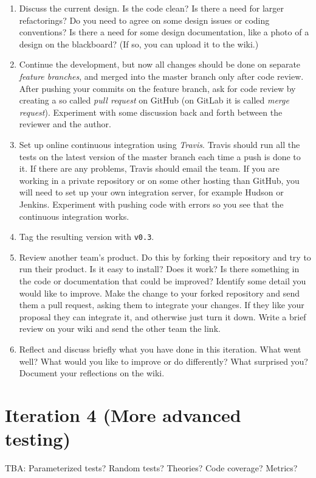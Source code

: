 \documentclass[swedish,english]{article}
\begin{document}
\begin{enumerate}
\item Discuss the current design. Is the code clean? Is there a need for larger refactorings? Do you need to agree on some design issues or coding conventions? Is there a need for some design documentation, like a photo of a design on the blackboard? (If so, you can upload it to the wiki.)
\item Continue the development, but now all changes should be done on separate \emph{feature branches}, and merged into the master branch only after code review. After pushing your commits on the feature branch, ask for code review by creating a so called \emph{pull request} on GitHub (on GitLab it is called \emph{merge request}). Experiment with some discussion back and forth between the reviewer and the author.
\item Set up online continuous integration using \emph{Travis}. Travis should run all the tests on the latest version of the master branch each time a push is done to it. If there are any problems, Travis should email the team. If you are working in a private repository or on some other hosting than GitHub, you will need to set up your own integration server, for example Hudson or Jenkins. Experiment with pushing code with errors so you see that the continuous integration works.
\item Tag the resulting version with \verb'v0.3'.
\item Review another team's product. Do this by forking their repository and try to run their product. Is it easy to install? Does it work? Is there something in the code or documentation that could be improved? Identify some detail you would like to improve. Make the change to your forked repository and send them a pull request, asking them to integrate your changes. If they like your proposal they can integrate it, and otherwise just turn it down. Write a brief review on your wiki and send the other team the link.
\item Reflect and discuss briefly what you have done in this iteration. What went well? What would you like to improve or do differently? What surprised you? Document your reflections on the wiki.
\end{enumerate}

\section*{Iteration 4 (More advanced testing)}

TBA: 
Parameterized tests?
Random tests?
Theories?
Code coverage?
Metrics?
\end{document}

